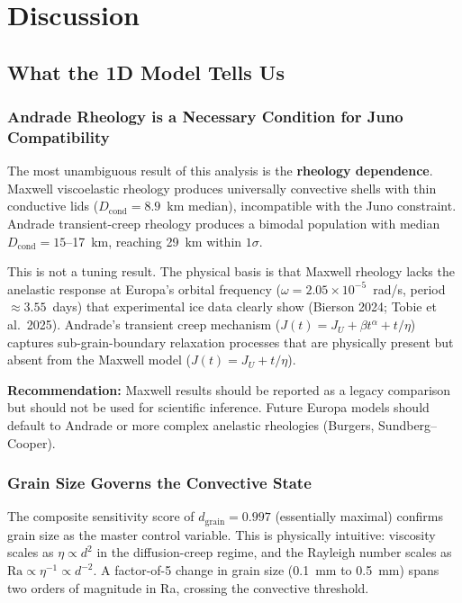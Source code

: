 \documentclass[11pt,letterpaper]{article}
\begin{document}
\section{Discussion}
\label{sec:discussion}

\subsection{What the 1D Model Tells Us}

\subsubsection{Andrade Rheology is a Necessary Condition for Juno Compatibility}

The most unambiguous result of this analysis is the \textbf{rheology dependence}. Maxwell viscoelastic rheology produces universally convective shells with thin conductive lids ($D_\mathrm{cond} = 8.9$~km median), incompatible with the Juno constraint. Andrade transient-creep rheology produces a bimodal population with median $D_\mathrm{cond} = 15$--17~km, reaching 29~km within $1\sigma$.

This is not a tuning result. The physical basis is that Maxwell rheology lacks the anelastic response at Europa's orbital frequency ($\omega = 2.05 \times 10^{-5}$~rad/s, period $\approx 3.55$~days) that experimental ice data clearly show (Bierson 2024; Tobie et al.\ 2025). Andrade's transient creep mechanism ($J(t) = J_U + \beta t^\alpha + t/\eta$) captures sub-grain-boundary relaxation processes that are physically present but absent from the Maxwell model ($J(t) = J_U + t/\eta$).

\textbf{Recommendation:} Maxwell results should be reported as a legacy comparison but should not be used for scientific inference. Future Europa models should default to Andrade or more complex anelastic rheologies (Burgers, Sundberg--Cooper).

\subsubsection{Grain Size Governs the Convective State}

The composite sensitivity score of $d_\mathrm{grain} = 0.997$ (essentially maximal) confirms grain size as the master control variable. This is physically intuitive: viscosity scales as $\eta \propto d^2$ in the diffusion-creep regime, and the Rayleigh number scales as $\mathrm{Ra} \propto \eta^{-1} \propto d^{-2}$. A factor-of-5 change in grain size (0.1~mm to 0.5~mm) spans two orders of magnitude in Ra, crossing the convective threshold.
\end{document}
